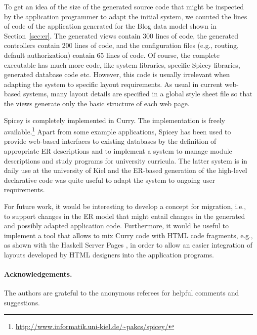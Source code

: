 \documentclass{tlp}
\renewcommand{\tt}{\usefont{OT1}{cmtt}{m}{n}\selectfont}
\newcommand{\code}[1]{\mbox{\tt #1}}   \newcommand{\ccode}[1]{``\mbox{\tt #1}''}  \newcommand{\bs}{\char92} \newcommand{\us}{\char95}
\begin{document}
To get an idea of the size of the generated source code
that might be inspected by the application programmer to adapt
the initial system, we counted the lines of code of the
application generated for the \code{Blog} data model
shown in Section~\ref{sec:er}.
The generated views contain 300 lines of code,
the generated controllers contain 200 lines of code,
and the configuration files (e.g., routing, default authorization)
contain 65 lines of code.
Of course, the complete executable has much more code,
like system libraries, specific Spicey libraries,
generated database code etc.
However, this code is usually irrelevant when
adapting the system to specific layout requirements.
As usual in current web-based systems, many layout details
are specified in a global style sheet file so that
the views generate only the basic structure of each web page.

Spicey is completely implemented in Curry.
The implementation is freely available.\footnote{\tt\url{http://www.informatik.uni-kiel.de/~pakcs/spicey/}}
Apart from some example applications, Spicey has been used
to provide web-based interfaces to existing databases
by the definition of appropriate ER descriptions
and to implement a system to manage module descriptions and study programs
for university curricula.
The latter system is in daily use at the university of Kiel
and the ER-based generation of the high-level declarative code
was quite useful to adapt the system to ongoing user requirements.

For future work, it would be interesting to develop a concept
for migration, i.e., to support changes in the ER model
that might entail changes in the generated and possibly adapted
application code.
Furthermore, it would be useful to implement a tool that
allows to mix Curry code with HTML code fragments, e.g., as shown with
the Haskell Server Pages \cite{MeijervanVelzen00},
in order to allow an easier integration of layouts developed
by HTML designers into the application programs.

\paragraph{Acknowledgements.}
The authors are grateful to the anonymous referees
for helpful comments and suggestions.
\end{document}
